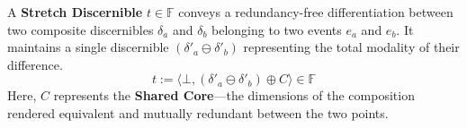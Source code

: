 

\begin{formalism}
    A \textbf{Stretch Discernible} $t \in \mathbb{F}$ conveys a
    redundancy-free differentiation between two composite discernibles
    $\delta_a$ and $\delta_b$ belonging to two events $e_a$ and $e_b$. It
    maintains a single discernible $(\delta'_a \ominus \delta'_b)$
    representing the total modality of their difference.
    \begin{equation}
        t := \langle \bot, (\delta'_a \ominus \delta'_b) \oplus C \rangle \in \mathbb{F}
    \end{equation}
    Here, $C$ represents the \textbf{Shared Core}---the dimensions of the
    composition rendered equivalent and mutually redundant between the two
    points.
\end{formalism}



